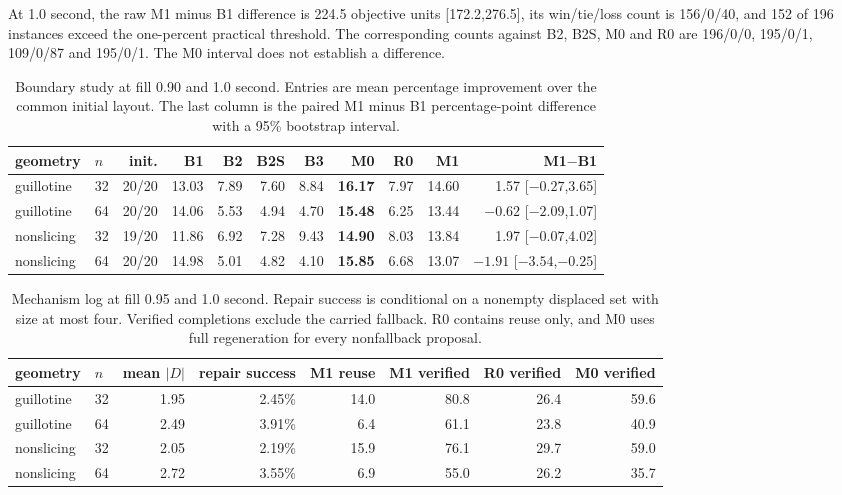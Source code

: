\documentclass[11pt]{article}
\begin{document}
At 1.0 second, the raw M1 minus B1 difference is 224.5 objective units
[172.2,276.5], its win/tie/loss count is 156/0/40, and 152 of 196 instances
exceed the one-percent practical threshold. The corresponding counts against
B2, B2S, M0 and R0 are 196/0/0, 195/0/1, 109/0/87 and 195/0/1. The M0 interval
does not establish a difference.

\begin{table}[htbp]
\centering
\caption{Boundary study at fill 0.90 and 1.0 second. Entries are mean
percentage improvement over the common initial layout. The last column is the
paired M1 minus B1 percentage-point difference with a 95\% bootstrap interval.}
\label{tab:sharedboundary}
\footnotesize
\setlength{\tabcolsep}{3.5pt}
\begin{tabular}{@{}llrrrrrrrrr@{}}
\toprule
geometry & $n$ & init. & B1 & B2 & B2S & B3 & M0 & R0 & M1 & M1$-$B1 \\
\midrule
guillotine & 32 & 20/20 & 13.03 & 7.89 & 7.60 & 8.84 & \textbf{16.17} & 7.97 & 14.60 & 1.57 [$-0.27$,3.65] \\
guillotine & 64 & 20/20 & 14.06 & 5.53 & 4.94 & 4.70 & \textbf{15.48} & 6.25 & 13.44 & $-0.62$ [$-2.09$,1.07] \\
nonslicing & 32 & 19/20 & 11.86 & 6.92 & 7.28 & 9.43 & \textbf{14.90} & 8.03 & 13.84 & 1.97 [$-0.07$,4.02] \\
nonslicing & 64 & 20/20 & 14.98 & 5.01 & 4.82 & 4.10 & \textbf{15.85} & 6.68 & 13.07 & $-1.91$ [$-3.54$,$-0.25$] \\
\bottomrule
\end{tabular}
\end{table}

\begin{table}[htbp]
\centering
\caption{Mechanism log at fill 0.95 and 1.0 second. Repair success is
conditional on a nonempty displaced set with size at most four. Verified
completions exclude the carried fallback. R0 contains reuse only, and M0 uses
full regeneration for every nonfallback proposal.}
\label{tab:repairmechanism}
\small
\begin{tabular}{@{}llrrrrrr@{}}
\toprule
geometry & $n$ & mean $|D|$ & repair success & M1 reuse & M1 verified & R0 verified & M0 verified \\
\midrule
guillotine & 32 & 1.95 & 2.45\% & 14.0 & 80.8 & 26.4 & 59.6 \\
guillotine & 64 & 2.49 & 3.91\% & 6.4 & 61.1 & 23.8 & 40.9 \\
nonslicing & 32 & 2.05 & 2.19\% & 15.9 & 76.1 & 29.7 & 59.0 \\
nonslicing & 64 & 2.72 & 3.55\% & 6.9 & 55.0 & 26.2 & 35.7 \\
\bottomrule
\end{tabular}
\end{table}
\end{document}
